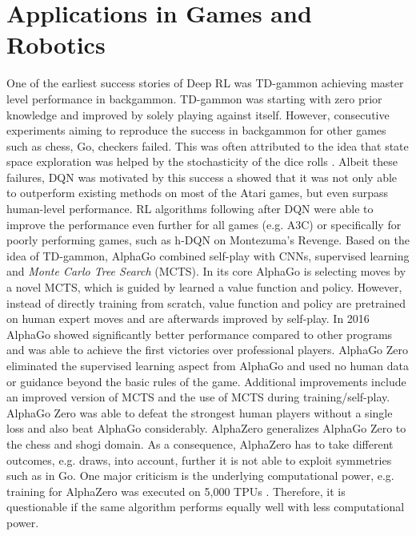     \section{Applications in Games and Robotics}
    \label{sec:games}
    One of the earliest success stories of Deep RL was TD-gammon \cite{Tesauro1994} achieving master level performance in backgammon.
    TD-gammon was starting with zero prior knowledge and improved by solely playing against itself.
    However, consecutive experiments aiming to reproduce the success in backgammon for other games such as chess, Go, checkers failed.
    This was often attributed to the idea that state space exploration was helped by the stochasticity of the dice rolls \cite{Pollack1997}.
    Albeit these failures, DQN was motivated by this success a showed that it was not only able to outperform existing methods on most of the Atari games, but even surpass human-level performance. 
    RL algorithms following after DQN were able to improve the performance even further for all games (e.g. A3C) or specifically for poorly performing games, such as h-DQN on Montezuma's Revenge.
    Based on the idea of TD-gammon, AlphaGo \cite{Silver2016} combined self-play with CNNs, supervised learning and \textit{Monte Carlo Tree Search} (MCTS). 
    In its core AlphaGo is selecting moves by a novel MCTS, which is guided by learned a value function and policy.
    However, instead of directly training from scratch, value function and policy are pretrained on human expert moves and are afterwards improved by self-play.
    In 2016 AlphaGo showed significantly better performance compared to other programs and was able to achieve the first victories over professional players.
    AlphaGo Zero \cite{Silver2017a} eliminated the supervised learning aspect from AlphaGo and used no human data or guidance beyond the basic rules of the game.
    Additional improvements include an improved version of MCTS and the use of MCTS during training/self-play.
    AlphaGo Zero was able to defeat the strongest human players without a single loss and also beat AlphaGo considerably.
    AlphaZero \cite{Silver2017} generalizes AlphaGo Zero to the chess and shogi domain.
    As a consequence, AlphaZero has to take different outcomes, e.g. draws, into account, further it is not able to exploit symmetries such as in Go.
    One major criticism is the underlying computational power, e.g. training for AlphaZero was executed on 5,000 TPUs \cite{Jouppi2017}. 
    Therefore, it is questionable if the same algorithm performs equally well with less computational power. 
    
